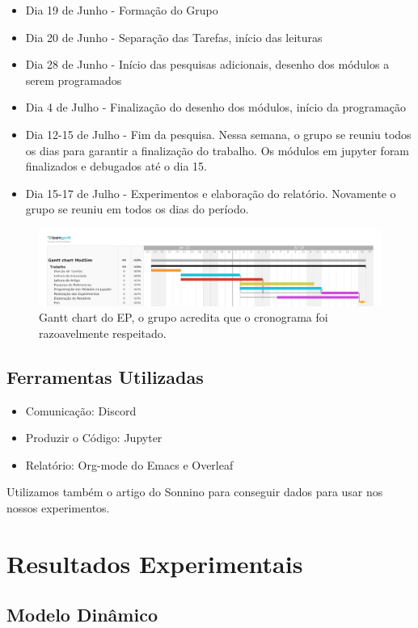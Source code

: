 \documentclass[11pt]{article}
\begin{document}
\begin{itemize}
\item Dia 19 de Junho - Formação do Grupo
\item Dia 20 de Junho - Separação das Tarefas, início das leituras
\item Dia 28 de Junho - Início das pesquisas adicionais, desenho dos módulos a serem programados
\item Dia 4 de Julho  - Finalização do desenho dos módulos, início da programação
\item Dia 12-15 de Julho - Fim da pesquisa. Nessa semana, o grupo se reuniu todos os dias para garantir a finalização do trabalho. Os módulos em jupyter foram finalizados e debugados até o dia 15.
\item Dia 15-17 de Julho - Experimentos e elaboração do relatório. Novamente o grupo se reuniu em todos os dias do período.
\end{itemize}

\begin{figure}[htbp]
\centering
\includegraphics[width=500px]{images/Gantt_chart_ModSim.png}
\caption{Gantt chart do EP, o grupo acredita que o cronograma foi razoavelmente respeitado.}
\end{figure}
\subsection{Ferramentas Utilizadas}
\label{sec:orgea1c91c}
\begin{itemize}
\item Comunicação: Discord
\item Produzir o Código: Jupyter
\item Relatório: Org-mode do Emacs e Overleaf
\end{itemize}
Utilizamos também o artigo do Sonnino para conseguir
dados para usar nos nossos experimentos.
\section{Resultados Experimentais}
\label{sec:org65e25ac}
\subsection{Modelo Dinâmico}
\label{sec:org7ecb80c}
\end{document}
